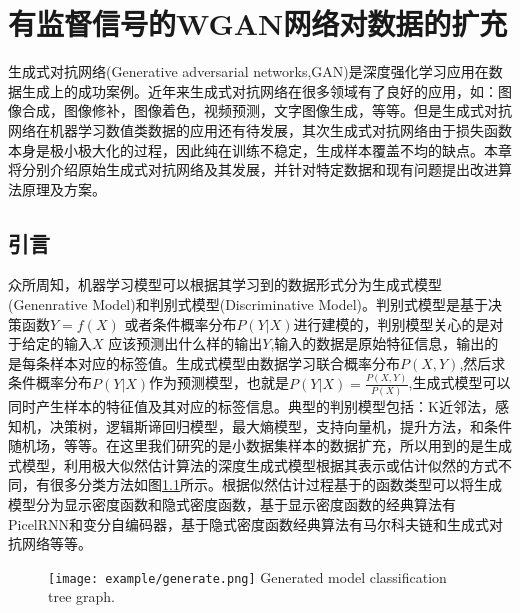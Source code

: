 \chapter{有监督信号的WGAN网络对数据的扩充}
生成式对抗网络(Generative adversarial networks,GAN)\cite{Goodfellow2017NIPS}是深度强化学习应用在数据生成上的成功案例。近年来生成式对抗网络在很多领域有了良好的应用，如：图像合成，图像修补，图像着色，视频预测，文字图像生成，等等。但是生成式对抗网络在机器学习数值类数据的应用还有待发展，其次生成式对抗网络由于损失函数本身是极小极大化的过程，因此纯在训练不稳定，生成样本覆盖不均的缺点。本章将分别介绍原始生成式对抗网络及其发展，并针对特定数据和现有问题提出改进算法原理及方案。
\section{引言}

众所周知，机器学习模型可以根据其学习到的数据形式分为生成式模型(Genenrative Model)和判别式模型(Discriminative Model)。判别式模型是基于决策函数$Y = f(X) $ 或者条件概率分布$ P(Y|X)$进行建模的，判别模型关心的是对于给定的输入$X$ 应该预测出什么样的输出$Y$,输入的数据是原始特征信息，输出的是每条样本对应的标签值。生成式模型由数据学习联合概率分布$P(X,Y)$,然后求条件概率分布$P(Y|X)$作为预测模型，也就是$P(Y|X) = \frac{{P(X,Y)}}{{P(X)}}$,生成式模型可以同时产生样本的特征值及其对应的标签信息\cite{bernardo2007generative}。典型的判别模型包括：K近邻法\cite{Hartigan1979Algorithm}，感知机，决策树，逻辑斯谛回归模型，最大熵模型，支持向量机，提升方法，和条件随机场，等等。在这里我们研究的是小数据集样本的数据扩充，所以用到的是生成式模型，利用极大似然估计算法的深度生成式模型根据其表示或估计似然的方式不同，有很多分类方法如图\ref{fig:生成式模型分类树状图}所示。根据似然估计过程基于的函数类型可以将生成模型分为显示密度函数和隐式密度函数，基于显示密度函数的经典算法有PicelRNN\cite{Oord2016Pixel}和变分自编码器\cite{Kingma2013Auto}，基于隐式密度函数经典算法有马尔科夫链和生成式对抗网络等等。

\begin{figure}[htpb]
	\centering
	\texttt{[image: example/generate.png]}
	{Generated model classification tree graph.}
	\label{fig:生成式模型分类树状图}
\end{figure}

